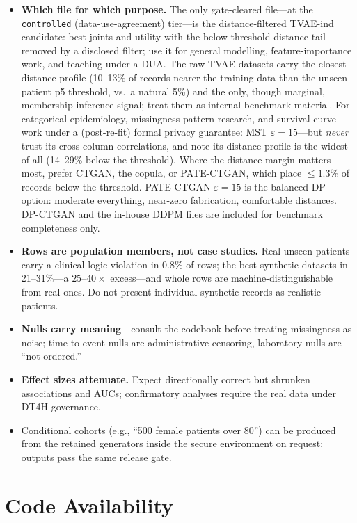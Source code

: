 \documentclass[11pt,a4paper]{article}
\newcommand{\eps}{\ensuremath{\varepsilon}}
\begin{document}
\begin{itemize}
\item \textbf{Which file for which purpose.} The only gate-cleared file---at the
\texttt{controlled} (data-use-agreement) tier---is the distance-filtered TVAE-ind
candidate: best joints and utility with the below-threshold distance tail removed
by a disclosed filter; use it for general modelling, feature-importance work, and
teaching under a DUA. The raw TVAE datasets carry the closest distance profile
(10--13\% of records nearer the training data than the unseen-patient p5
threshold, vs.\ a natural 5\%) and the only, though marginal,
membership-inference signal; treat them as internal benchmark material. For
categorical epidemiology, missingness-pattern research, and survival-curve work
under a (post-re-fit) formal privacy guarantee: MST $\eps = 15$---but \emph{never}
trust its cross-column correlations, and note its distance profile is the widest
of all (14--29\% below the threshold). Where the distance margin matters most,
prefer CTGAN, the copula, or PATE-CTGAN, which place ${\leq}1.3\%$ of records
below the threshold. PATE-CTGAN $\eps = 15$ is the balanced DP option: moderate
everything, near-zero fabrication, comfortable distances. DP-CTGAN and the
in-house DDPM files are included for benchmark completeness only.
\item \textbf{Rows are population members, not case studies.} Real unseen
patients carry a clinical-logic violation in 0.8\% of rows; the best synthetic
datasets in 21--31\%---a $25$--$40\times$ excess---and whole rows are
machine-distinguishable from real ones. Do not present individual synthetic
records as realistic patients.
\item \textbf{Nulls carry meaning}---consult the codebook before treating
missingness as noise; time-to-event nulls are administrative censoring, laboratory
nulls are ``not ordered.''
\item \textbf{Effect sizes attenuate.} Expect directionally correct but shrunken
associations and AUCs; confirmatory analyses require the real data under DT4H
governance.
\item Conditional cohorts (e.g., ``500 female patients over 80'') can be produced
from the retained generators inside the secure environment on request; outputs pass
the same release gate.
\end{itemize}

\section{Code Availability}
\end{document}
